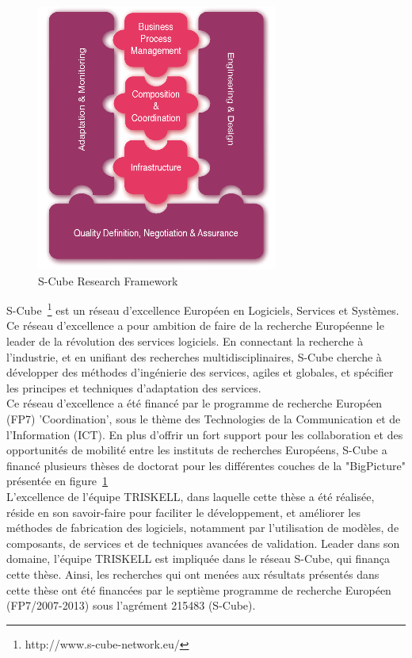\begin{figure}
  \centering
  \includegraphics[width=.5\textwidth]{part1/pics/scube-overview.png}
  \caption{S-Cube Research Framework}
  \label{fig:scube-overview}
\end{figure}
S-Cube~\footnote{http://www.s-cube-network.eu/} est un réseau d'excellence Européen en Logiciels, Services et Systèmes. Ce réseau d'excellence a pour ambition de faire de la recherche Européenne le leader de la révolution des services logiciels. En connectant la recherche à l'industrie, et en unifiant des recherches multidisciplinaires, S-Cube cherche à développer des méthodes d'ingénierie des services, agiles et globales, et spécifier les principes et techniques d'adaptation des services.\\
Ce réseau d'excellence a été financé par le programme de recherche Européen (FP7) 'Coordination', sous le thème des Technologies de la Communication et de l'Information (ICT). En plus d'offrir un fort support pour les collaboration et des opportunités de mobilité entre les instituts de recherches Européens, S-Cube a financé plusieurs thèses de doctorat pour les différentes couches de la "BigPicture" présentée en figure~\ref{fig:scube-overview}\\

L'excellence de l'équipe TRISKELL, dans laquelle cette thèse a été réalisée, réside en son savoir-faire pour faciliter le développement, et améliorer les méthodes de fabrication des logiciels, notamment par l'utilisation de modèles, de composants, de services et de techniques avancées de validation. Leader dans son domaine, l'équipe TRISKELL est impliquée dans le réseau S-Cube, qui finança cette thèse. Ainsi, les recherches qui ont menées aux résultats présentés dans cette thèse ont été financées par le septième programme de recherche Européen (FP7/2007-2013) sous l'agrément 215483 (S-Cube).


